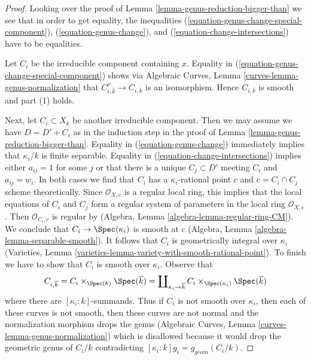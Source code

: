 \begin{proof}
Looking over the proof of Lemma \ref{lemma-genus-reduction-bigger-than}
we see that in order to get equality, the inequalities
(\ref{equation-genus-change-special-component}),
(\ref{equation-genus-change}), and
(\ref{equation-change-intersections})
have to be equalities.

\medskip\noindent
Let $C_i$ be the irreducible component containing $x$.
Equality in (\ref{equation-genus-change-special-component})
shows via
Algebraic Curves, Lemma \ref{curves-lemma-genus-normalization}
that $C_{i, \overline{k}}^\nu \to C_{i, \overline{k}}$ is
an isomorphism. Hence $C_{i, \overline{k}}$ is smooth
and part (1) holds.

\medskip\noindent
Next, let $C_i \subset X_k$ be another irreducible component.
Then we may assume we have $D =  D' + C_i$ as in the induction step
in the proof of Lemma \ref{lemma-genus-reduction-bigger-than}.
Equality in (\ref{equation-genus-change}) immediately implies
that $\kappa_i/k$ is finite separable.
Equality in (\ref{equation-change-intersections})
implies either $a_{ij} = 1$ for some $j$ or that there is a
unique $C_j \subset D'$ meeting $C_i$ and $a_{ij} = w_i$.
In both cases we find that $C_i$ has a $\kappa_i$-rational point
$c$ and $c = C_i \cap C_j$ scheme theoretically.
Since $\mathcal{O}_{X, c}$ is a regular local ring,
this implies that the local equations of $C_i$ and $C_j$
form a regular system of parameters in the local ring $\mathcal{O}_{X, c}$.
Then $\mathcal{O}_{C_i, c}$ is regular by
(Algebra, Lemma \ref{algebra-lemma-regular-ring-CM}).
We conclude that $C_i \to \Spec(\kappa_i)$ is smooth at $c$
(Algebra, Lemma \ref{algebra-lemma-separable-smooth}).
It follows that $C_i$ is geometrically integral over $\kappa_i$
(Varieties, Lemma \ref{varieties-lemma-variety-with-smooth-rational-point}).
To finish we have to show that $C_i$ is smooth over $\kappa_i$. Observe that
$$
C_{i, \overline{k}} = C_i \times_{\Spec(k)} \Spec(\overline{k})
= \coprod\nolimits_{\kappa_i \to \overline{k}}
C_i \times_{\Spec(\kappa_i)} \Spec(\overline{k})
$$
where there are $[\kappa_i : k]$-summands. Thus if $C_i$ is not
smooth over $\kappa_i$, then each of these curves is not smooth, then
these curves are not normal and the normalization morphism drops the genus
(Algebraic Curves, Lemma \ref{curves-lemma-genus-normalization})
which is disallowed because it would drop the geometric genus
of $C_i/k$ contradicting $[\kappa_i : k] g_i = g_{geom}(C_i/k)$.
\end{proof}








